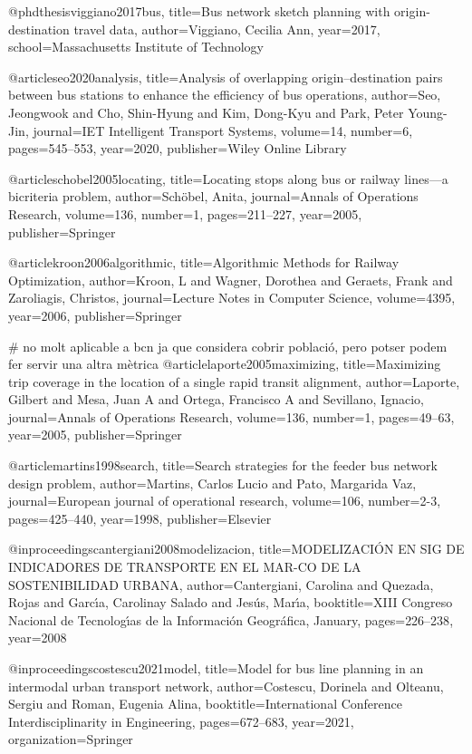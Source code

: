 @phdthesis{viggiano2017bus,
  title={Bus network sketch planning with origin-destination travel data},
  author={Viggiano, Cecilia Ann},
  year={2017},
  school={Massachusetts Institute of Technology}
}


@article{seo2020analysis,
  title={Analysis of overlapping origin--destination pairs between bus stations to enhance the efficiency of bus operations},
  author={Seo, Jeongwook and Cho, Shin-Hyung and Kim, Dong-Kyu and Park, Peter Young-Jin},
  journal={IET Intelligent Transport Systems},
  volume={14},
  number={6},
  pages={545--553},
  year={2020},
  publisher={Wiley Online Library}
}


@article{schobel2005locating,
  title={Locating stops along bus or railway lines—a bicriteria problem},
  author={Sch{\"o}bel, Anita},
  journal={Annals of Operations Research},
  volume={136},
  number={1},
  pages={211--227},
  year={2005},
  publisher={Springer}
}

@article{kroon2006algorithmic,
  title={Algorithmic Methods for Railway Optimization},
  author={Kroon, L and Wagner, Dorothea and Geraets, Frank and Zaroliagis, Christos},
  journal={Lecture Notes in Computer Science},
  volume={4395},
  year={2006},
  publisher={Springer}
}

# no molt aplicable a bcn ja que considera cobrir població, pero potser podem fer servir una altra mètrica
@article{laporte2005maximizing,
  title={Maximizing trip coverage in the location of a single rapid transit alignment},
  author={Laporte, Gilbert and Mesa, Juan A and Ortega, Francisco A and Sevillano, Ignacio},
  journal={Annals of Operations Research},
  volume={136},
  number={1},
  pages={49--63},
  year={2005},
  publisher={Springer}
}

@article{martins1998search,
  title={Search strategies for the feeder bus network design problem},
  author={Martins, Carlos Lucio and Pato, Margarida Vaz},
  journal={European journal of operational research},
  volume={106},
  number={2-3},
  pages={425--440},
  year={1998},
  publisher={Elsevier}
}


@inproceedings{cantergiani2008modelizacion,
  title={MODELIZACI{\'O}N EN SIG DE INDICADORES DE TRANSPORTE EN EL MAR-CO DE LA SOSTENIBILIDAD URBANA},
  author={Cantergiani, Carolina and Quezada, Rojas and Garc{\'\i}a, Carolinay Salado and Jes{\'u}s, Mar{\'\i}a},
  booktitle={XIII Congreso Nacional de Tecnolog{\'\i}as de la Informaci{\'o}n Geogr{\'a}fica, January},
  pages={226--238},
  year={2008}
}

@inproceedings{costescu2021model,
  title={Model for bus line planning in an intermodal urban transport network},
  author={Costescu, Dorinela and Olteanu, Sergiu and Roman, Eugenia Alina},
  booktitle={International Conference Interdisciplinarity in Engineering},
  pages={672--683},
  year={2021},
  organization={Springer}
}


